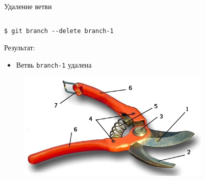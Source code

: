 \documentclass[presentation]{beamer}
\begin{document}
\begin{frame}[fragile]{Удаление ветви}
  \begin{columns}
    \begin{column}{.4\textwidth}
\begin{verbatim}
$ git branch --delete branch-1
\end{verbatim}
      Результат:
      \begin{itemize}
      \item Ветвь \texttt{branch-1} удалена
      \end{itemize}
        \begin{figure}[htb]
          \centering
          \includegraphics[height=.7\textwidth]{Sekator_shema}
        \end{figure}
      \end{column}
      \begin{column}{.6\textwidth}
        \begin{figure}[htb]
          \centering

\end{figure}
\end{column}
\end{columns}
\end{frame}
\end{document}
